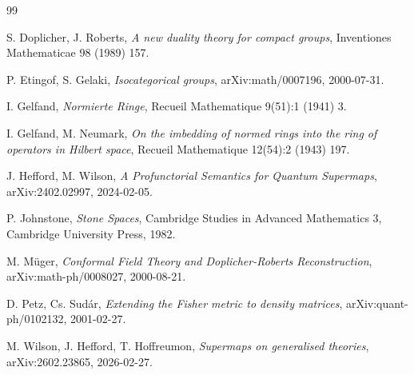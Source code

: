 \documentclass[11pt,letterpaper]{article}
\theoremstyle{definition}
\theoremstyle{remark}
\begin{document}
\begin{thebibliography}{99}

S. Doplicher, J. Roberts, \emph{A new duality theory for compact groups}, Inventiones Mathematicae 98 (1989) 157.

P. Etingof, S. Gelaki, \emph{Isocategorical groups}, arXiv:math/0007196, 2000-07-31.

I. Gelfand, \emph{Normierte Ringe}, Recueil Mathematique 9(51):1 (1941) 3.

I. Gelfand, M. Neumark, \emph{On the imbedding of normed rings into the ring of operators in Hilbert space}, Recueil Mathematique 12(54):2 (1943) 197.

J. Hefford, M. Wilson, \emph{A Profunctorial Semantics for Quantum Supermaps}, arXiv:2402.02997, 2024-02-05.

P. Johnstone, \emph{Stone Spaces}, Cambridge Studies in Advanced Mathematics 3, Cambridge University Press, 1982.

M. M{\"u}ger, \emph{Conformal Field Theory and Doplicher-Roberts Reconstruction}, arXiv:math-ph/0008027, 2000-08-21.

D. Petz, Cs. Sud{\'a}r, \emph{Extending the Fisher metric to density matrices}, arXiv:quant-ph/0102132, 2001-02-27.

M. Wilson, J. Hefford, T. Hoffreumon, \emph{Supermaps on generalised theories}, arXiv:2602.23865, 2026-02-27.

\end{thebibliography}
\end{document}
